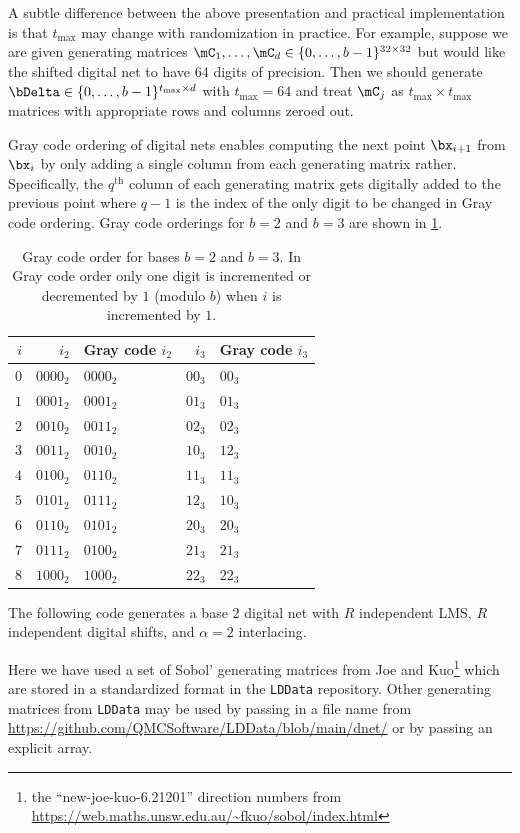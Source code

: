 \documentclass[acmsmall]{acmart}
\begin{document}
A subtle difference between the above presentation and practical implementation is that $t_\mathrm{max}$ may change with randomization in practice. For example, suppose we are given generating matrices $\mC_1,\dots,\mC_d \in \{0,\dots,b-1\}^{32 \times32}$ but would like the shifted digital net to have $64$ digits of precision. Then we should generate $\bDelta \in \{0,\dots,b-1\}^{t_\mathrm{max} \times d}$ with $t_\mathrm{max}=64$ and treat $\mC_j$ as $t_\mathrm{max} \times t_\mathrm{max}$ matrices with appropriate rows and columns zeroed out. 

Gray code ordering of digital nets enables computing the next point $\bx_{i+1}$ from $\bx_i$ by only adding a single column from each generating matrix rather. Specifically, the $q^\mathrm{th}$ column of each generating matrix gets digitally added to the previous point where $q-1$ is the index of the only digit to be changed in Gray code ordering. Gray code orderings for $b=2$ and $b=3$ are shown in \cref{tab:Gray code}. 

\begin{table}[H]
    \centering
    \begin{tabular}{r | r l | r l }
        $i$ & $i_2$ & Gray code  $i_2$ & $i_3$ & Gray code $i_3$ \\
        \hline 
        $0$ & $0000_2$ & $0000_2$ & $00_3$ & $00_3$ \\
        $1$ & $0001_2$ & $0001_2$ & $01_3$ & $01_3$ \\ 
        $2$ & $0010_2$ & $0011_2$ & $02_3$ & $02_3$ \\ 
        $3$ & $0011_2$ & $0010_2$ & $10_3$ & $12_3$ \\ 
        $4$ & $0100_2$ & $0110_2$ & $11_3$ & $11_3$ \\ 
        $5$ & $0101_2$ & $0111_2$ & $12_3$ & $10_3$ \\ 
        $6$ & $0110_2$ & $0101_2$ & $20_3$ & $20_3$ \\ 
        $7$ & $0111_2$ & $0100_2$ & $21_3$ & $21_3$ \\ 
        $8$ & $1000_2$ & $1000_2$ & $22_3$ & $22_3$
    \end{tabular}
    \caption{Gray code order for bases $b=2$ and $b=3$. In Gray code order only one digit is incremented or decremented by $1$ (modulo $b$) when $i$ is incremented by $1$.}
    \label{tab:Gray code} 
\end{table}

The following code generates a base $2$ digital net with $R$ independent LMS, $R$ independent digital shifts, and $\alpha=2$ interlacing. 

Here we have used a set of Sobol' generating matrices from Joe and Kuo\footnote{the ``new-joe-kuo-6.21201'' direction numbers from \url{https://web.maths.unsw.edu.au/~fkuo/sobol/index.html}} \citep{joe2008constructing} which are stored in a standardized format in the \texttt{LDData} repository. Other generating matrices from \texttt{LDData} may be used by passing in a file name from \url{https://github.com/QMCSoftware/LDData/blob/main/dnet/} or by passing an explicit array. 
\end{document}
